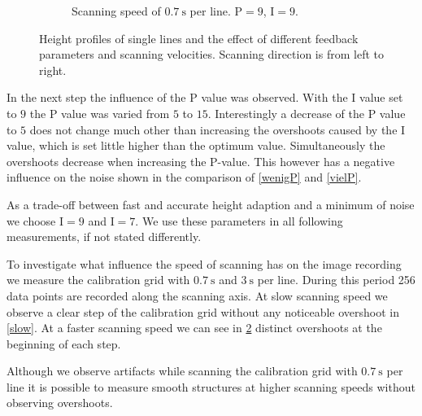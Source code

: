 \documentclass[paper=a4,fontsize=10pt,DIV=18,twocolumn,parskip=half]{scrartcl}
\numberwithin{equation}{section}    %
\begin{document}
\begin{figure}
\begin{subfigure}{0.45\columnwidth}
        \caption{Scanning speed of 
        $\SI{0.7}{\second}$ per line. $\mathrm{P}=9$, $\mathrm{I}=9$.}
        \label{fast}
    \end{subfigure}
    \caption{Height profiles of single lines and the effect of different 
    feedback parameters and scanning velocities. Scanning direction is from left 
    to right.}
\end{figure}

In the next step the influence of the P value was observed. With the I value set 
to $9$ the P value was varied from $5$ to $15$. Interestingly a decrease of the 
P value to $5$ does not change much other than increasing the overshoots caused 
by the I value, which is set little higher than the optimum value. 
Simultaneously the overshoots decrease when increasing the P-value. This however 
has a negative influence on the noise shown in the comparison of \ref{wenigP} 
and \ref{vielP}.

As a trade-off between fast and accurate height adaption and a minimum of noise 
we choose $\mathrm{I}=9$ and $\mathrm{I}=7$. We use these parameters in all 
following measurements, if not stated differently.

To investigate what influence the speed of scanning has on the image recording 
we measure the calibration grid with $\SI{0.7}{\second}$ and $\SI{3}{\second}$ 
per line. During this period 256 data points are recorded along the scanning 
axis.  At slow scanning speed we observe a clear step of the calibration grid 
without any noticeable overshoot in \ref{slow}. At a faster scanning speed 
we can see in \ref{fast} distinct overshoots at the beginning of each step.

Although we observe artifacts while scanning the calibration grid with  
$\SI{0.7}{\second}$ per line it is possible to measure smooth structures 
at higher scanning speeds without observing overshoots.
\end{document}
